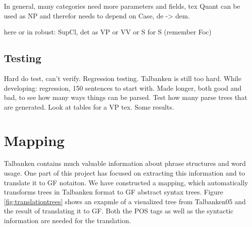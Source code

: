 \documentclass{report}
\begin{document}
In general, many categories need more parameters and fields, tex Quant can be used as NP
and therefor needs to depend on Case, de -> dem.

here or in robust: SupCl, det as VP or VV or S for S (remember Foc)

\subsection{Testing}
Hard do test, can't verify. Regression testing. Talbanken is still too hard.
While developing: regression, 150 sentences to start with. Made longer, both good and bad,
to see how many ways things can be parsed.
Test how many parse trees that are generated.
Look at tables for a VP tex.
Some results.


\section{Mapping}
\label{sec:Mapping}
Talbanken contains much valuable information about phrase structures and word 
usage. One part of this project has focused on extracting this information
and to translate it to GF notaiton. We have constructed a mapping, which 
automatically transforms trees in Talbanken format to GF abstract syntax trees.
Figure \ref{fig:translationtrees} shows an exapmle of a visualized tree
from Talbanken05 and the result of translating it to GF.
Both the POS tags as well as the syntactic information are needed for the translation.
\end{document}

